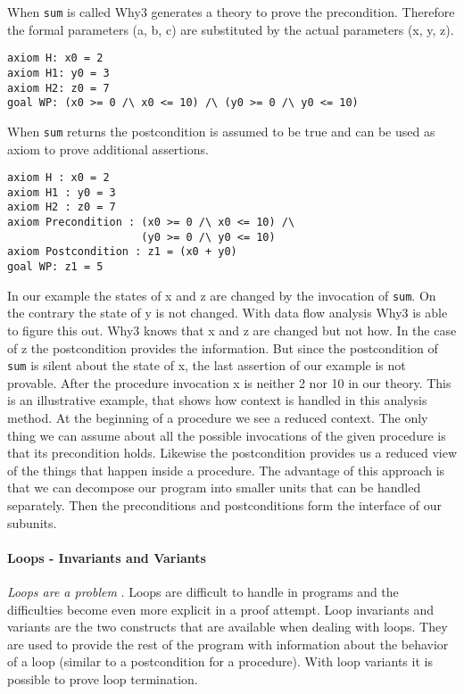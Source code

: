 When \verb"sum" is called Why3 generates a theory to prove the precondition.
Therefore the formal parameters (a, b, c) are substituted by the actual
parameters (x, y, z).
\begin{lstlisting}
axiom H: x0 = 2
axiom H1: y0 = 3
axiom H2: z0 = 7
goal WP: (x0 >= 0 /\ x0 <= 10) /\ (y0 >= 0 /\ y0 <= 10)
\end{lstlisting}
When \verb"sum" returns the postcondition is assumed to be true and can be 
used as axiom to prove additional assertions.
\begin{lstlisting}
axiom H : x0 = 2
axiom H1 : y0 = 3
axiom H2 : z0 = 7
axiom Precondition : (x0 >= 0 /\ x0 <= 10) /\ 
                     (y0 >= 0 /\ y0 <= 10)
axiom Postcondition : z1 = (x0 + y0)
goal WP: z1 = 5
\end{lstlisting}
In our example the states of x and z are changed by the invocation of 
\verb"sum". On the contrary the state of y is not changed. With data flow 
analysis Why3 is able to figure this out. Why3 knows that x and z are 
changed but not how. In the case of z the postcondition provides the 
information. But since the postcondition of \verb"sum" is silent about the state
of x, the last assertion of our example is not provable. After the 
procedure invocation x is neither 2 nor 10 in our theory.
This is an illustrative example, that shows how context is handled in this analysis
method. At the beginning of a procedure we see a reduced context. The only
thing we can assume about all the possible invocations of the given
procedure is that its precondition holds. Likewise the
postcondition provides us a reduced view of the things that happen inside
a procedure. The advantage of this approach is that we can decompose
our program into smaller units that can be handled separately. Then the
preconditions and postconditions form the interface of our subunits.

\paragraph{Loops - Invariants and Variants}

\emph{Loops are a problem} \cite[p. 201]{spark14}. Loops are difficult to handle in programs
and the difficulties become even more explicit in a proof attempt.
Loop invariants and variants are the two constructs that are available
when dealing with loops. They are used to provide the rest of the program
with information about the behavior of a loop (similar to a postcondition
for a procedure). With loop variants it is possible to prove loop 
termination.


